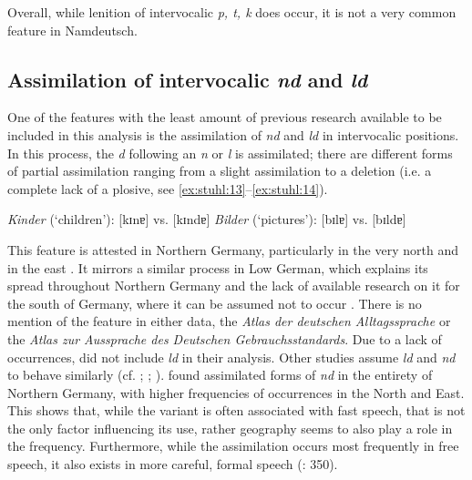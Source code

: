 \documentclass[output=paper]{langsci/langscibook}
\begin{document}
Overall, while lenition of intervocalic \textit{p, t, k} does occur, it is not a very common feature in Namdeutsch. 

\subsection{Assimilation of intervocalic \textit{nd} and \textit{ld}}
\label{sec:stuhl:4.6}

One of the features with the least amount of previous research available to be included in this analysis is the assimilation of \textit{nd} and \textit{ld} in intervocalic positions. In this process, the \textit{d} following an \textit{n} or \textit{l} is assimilated; there are different forms of partial assimilation ranging from a slight assimilation to a deletion (i.e. a complete lack of a plosive, see \ref{ex:stuhl:13}--\ref{ex:stuhl:14}).

 
\ea
\label{ex:stuhl:13}  
\textit{Kinder} (‘children’): {[kɪnɐ]} vs. {[kɪndɐ]}
\ex
\label{ex:stuhl:14}  
\textit{Bilder} (‘pictures’): {[bɪlɐ]} vs. {[bɪldɐ]}
\z
 
 

This feature is attested in Northern Germany, particularly in the very north and in the east \citep[349]{elmentaler_norddeutscher_2015}. It mirrors a similar process in Low German, which explains its spread throughout Northern Germany and the lack of available research on it for the south of Germany, where it can be assumed not to occur \citep[349]{elmentaler_norddeutscher_2015}. There is no mention of the feature in either  data, the \textit{Atlas der deutschen Alltagssprache} or the \textit{Atlas zur Aussprache des Deutschen Gebrauchsstandards}. Due to a lack of occurrences, \citet[349]{elmentaler_norddeutscher_2015} did not include \textit{ld} in their analysis. Other studies assume \textit{ld} and \textit{nd} to behave similarly (cf. \citealt{scheel_hamburger_1963}; \citealt{schonfeld_sprache_1989}; \citealt{mihm_sprachgeschichte_2000}). \citet[349--350]{elmentaler_norddeutscher_2015} found assimilated forms of \textit{nd} in the entirety of Northern Germany, with higher frequencies of occurrences in the North and East. This shows that, while the variant is often associated with fast speech, that is not the only factor influencing its use, rather geography seems to also play a role in the frequency. Furthermore, while the assimilation occurs most frequently in free speech, it also exists in more careful, formal speech (\citealt{elmentaler_norddeutscher_2015}: 350).
\end{document}
